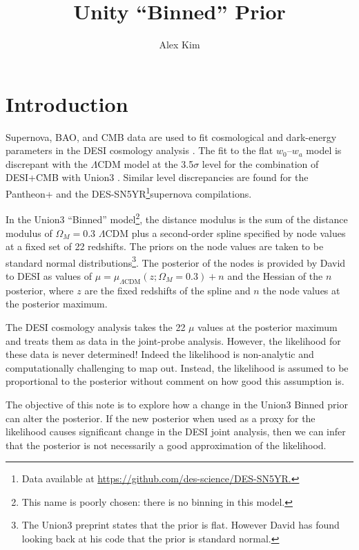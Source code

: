 \documentclass[11pt,a4paper]{article}
\title{Unity ``Binned'' Prior}
\author[a]{Alex Kim}
\affiliation[a]{Lawrence Berkeley National Laboratory}
\begin{document}
\maketitle

\section{Introduction}
Supernova, BAO, and CMB data are used to fit cosmological and dark-energy parameters in the DESI cosmology
analysis \cite{2024arXiv240403002D}.  The fit to the flat $w_0$--$w_a$ model is discrepant with the $\Lambda$CDM
model at the 3.5$\sigma$ level for the combination of DESI+CMB with Union3  \cite{2023arXiv231112098R}.
Similar level discrepancies are found for the Pantheon+ \cite{2022ApJ...938..113S} and the DES-SN5YR\footnote{Data available at \url{https://github.com/des-science/DES-SN5YR.}}supernova compilations.


In the Union3 ``Binned'' model\footnote{This name is poorly chosen: there is no binning in this model.}, the distance modulus
is the sum of the distance modulus of $\Omega_M=0.3$  $\Lambda$CDM plus a second-order spline specified by node values
at a fixed set of 22 redshifts.  The priors on the node values are taken to be standard normal distributions\footnote{The Union3 preprint states that the prior is flat.  However David has found looking back at his code
that the prior is standard normal.}.  
The posterior of the nodes is provided by David to DESI as values of
$\mu = \mu_{\Lambda \text{CDM}}(z;\Omega_M=0.3) + n$ and the Hessian of the $n$ posterior,
where $z$ are the fixed redshifts of the spline and $n$ the node values at the posterior maximum.


The DESI cosmology analysis takes the 22 $\mu$ values at the posterior maximum and treats them as data in the joint-probe analysis.  However, the likelihood for these data is never determined!
Indeed the likelihood is non-analytic and computationally challenging to map out.  Instead, the likelihood is assumed to be proportional
to the posterior without comment on how good this assumption is.

The objective of this note is to explore how a change in the Union3 Binned prior can alter the posterior.  If the new posterior when used
as a proxy for the likelihood causes significant change in the DESI joint analysis, then we can infer that the posterior is not
necessarily a good approximation of the likelihood.
\end{document}
